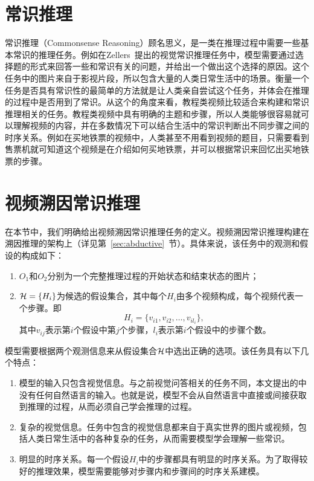 \section{常识推理}\label{sec:commonsense}
常识推理（Commonsense Reasoning）顾名思义，是一类在推理过程中需要一些基本常识的推理任务。例如在Zellers~\etal 提出的视觉常识推理\cite{zellers2019recognition}任务中，模型需要通过选择题的形式来回答一些和常识有关的问题，并给出一个做出这个选择的原因。这个任务中的图片来自于影视片段，所以包含大量的人类日常生活中的场景。衡量一个任务是否具有常识性的最简单的方法就是让人类亲自尝试这个任务，并体会在推理的过程中是否用到了常识。从这个的角度来看，教程类视频比较适合来构建和常识推理相关的任务。教程类视频中具有明确的主题和步骤，所以人类能够很容易就可以理解视频的内容，并在多数情况下可以结合生活中的常识判断出不同步骤之间的时序关系。例如在买地铁票的视频中，人类甚至不用看到视频的题目，只需要看到售票机就可知道这个视频是在介绍如何买地铁票，并可以根据常识来回忆出买地铁票的步骤。

\section{视频溯因常识推理}\label{sec:definition}

在本节中，我们明确给出视频溯因常识推理任务的定义。视频溯因常识推理构建在溯因推理的架构上（详见第~\ref{sec:abductive}~节）。具体来说，该任务中的观测和假设的构成如下：
\begin{enumerate}
    \item $O_1$和$O_2$分别为一个完整推理过程的开始状态和结束状态的图片；
    \item ${\mathcal{H}}=\{H_i\}$为候选的假设集合，其中每个$H_i$由多个视频构成，每个视频代表一个步骤。即
    \begin{equation}
        H_i = \{v_{i1}, v_{i2}, \ldots, v_{il_i}\},
    \end{equation}
    其中$v_{ij}$表示第$i$个假设中第$j$个步骤，$l_i$表示第$i$个假设中的步骤个数。
\end{enumerate}
模型需要根据两个观测信息来从假设集合${\mathcal{H}}$中选出正确的选项。该任务具有以下几个特点：
\begin{enumerate}
    \item 模型的输入只包含视觉信息。与之前视觉问答相关的任务不同，本文提出的\VACR 中没有任何自然语言的输入。也就是说，模型不会从自然语言中直接或间接获取到推理的过程，从而必须自己学会推理的过程。
    \item 复杂的视觉信息。任务中包含的视觉信息都来自于真实世界的图片或视频，包括人类日常生活中的各种复杂的任务，从而需要模型学会理解一些常识。
    \item 明显的时序关系。每一个假设$H_i$中的步骤都具有明显的时序关系。为了取得较好的推理效果，模型需要能够对步骤内和步骤间的时序关系建模。
\end{enumerate}


